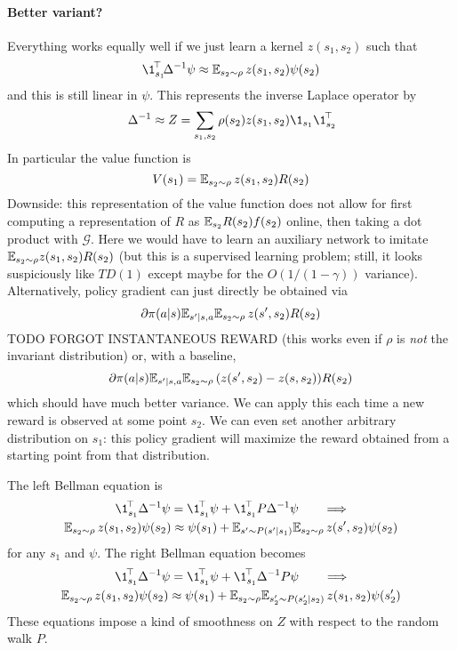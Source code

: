 \documentclass[11pt,a4paper]{article}
\newcommand{\green}{\mathcal{G}}
\begin{document}
\paragraph{Better variant?}
Everything works equally well if we just learn a kernel $z(s_1,s_2)$ such
that
\begin{equation}
\transp{\1_{s_1}}\Delta^{-1}\psi\approx \E_{s_2\sim \rho} \,z(s_1,s_2)
\psi(s_2)
\end{equation}
and this is still linear in $\psi$. This represents the inverse Laplace
operator by
\begin{equation}
\Delta^{-1}\approx Z=\sum_{s_1,s_2}\rho(s_2)  z(s_1,s_2)\1_{s_1}\transp{\1_{s_2}}
\end{equation}
In particular the value function is
\begin{equation}
V(s_1)=\mathbb{E}_{s_2\sim \rho} \, z(s_1,s_2) R(s_2)
\end{equation}
Downside: this representation of the value function does not allow for first
computing a representation of $R$ as $\mathbb{E}_{s_2} R(s_2)f(s_2)$ online, then taking a dot product with
$\green$. Here we would have to learn an auxiliary network to imitate
$\mathbb{E}_{s_2\sim \rho} z(s_1,s_2) R(s_2)$ (but this is a supervised learning
problem; still, it looks suspiciously like $TD(1)$ except maybe for the
$O(1/(1-\gamma))$ variance). Alternatively, policy gradient can just directly be obtained
via
\begin{equation}
\partial \pi(a|s)\mathbb{E}_{s'|s,a} \mathbb{E}_{s_2\sim \rho} \, z(s',s_2)R(s_2)
\end{equation}
TODO FORGOT INSTANTANEOUS REWARD
(this works even if $\rho$ is \emph{not} the invariant distribution) or,
with a baseline,
\begin{equation}
\partial \pi(a|s)\mathbb{E}_{s'|s,a} \mathbb{E}_{s_2\sim \rho} \, (z(s',s_2)-z(s,s_2))R(s_2)
\end{equation}
which should have much better variance. We
can apply this each time a new reward is observed at some point $s_2$. We
can even set another arbitrary distribution on $s_1$: this policy
gradient will maximize
the reward obtained from a starting point from that distribution.

The left Bellman equation is
\begin{gather}
\transp{\1_{s_1}}\,\Delta^{-1}\psi=\transp{\1_{s_1}}\,\psi+\transp{\1_{s_1}}\,P\Delta^{-1}\psi
\qquad \Longrightarrow
\\
\E_{s_2\sim \rho}
\,z(s_1,s_2)\psi(s_2)
\approx \psi(s_1)+ \E_{s'\sim P(s'|s_1)}
\E_{s_2\sim \rho}\,
z(s',s_2)\psi(s_2)
\end{gather}
for any $s_1$ and $\psi$.
The right Bellman equation becomes
\begin{gather}
\transp{\1_{s_1}}\,\Delta^{-1}\psi=\transp{\1_{s_1}}\,\psi+\transp{\1_{s_1}}\,\Delta^{-1}P\psi
\qquad \Longrightarrow
\\
\E_{s_2\sim \rho}\,
z(s_1,s_2)\psi(s_2)
\approx \psi(s_1)+ \E_{s_2\sim \rho}\E_{s'_2\sim P(s'_2|s_2)}\,
z(s_1,s_2)\psi(s'_2)
\end{gather}
These equations impose a kind of smoothness on $Z$ with respect to the
random walk $P$.
\end{document}
